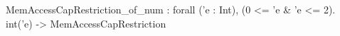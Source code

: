 MemAccessCapRestriction_of_num : forall ('e : Int), (0 <= 'e & 'e <= 2). int('e) -> MemAccessCapRestriction